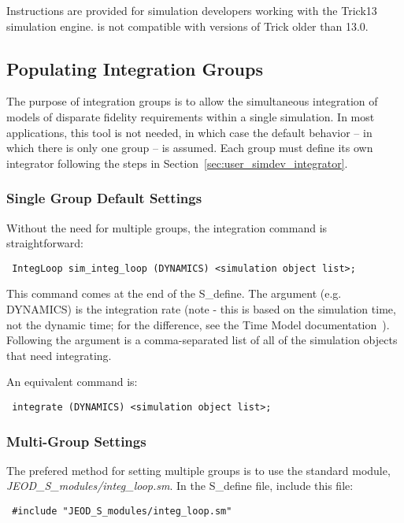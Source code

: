 Instructions are provided for simulation developers working with the Trick13 
simulation engine.  \JEODidx is not compatible with versions of Trick older than 13.0.

\subsection{Populating Integration Groups}\label{sec:user_simdev_groups}
The purpose of integration groups is to 
allow the simultaneous integration of models of disparate fidelity 
requirements within a single simulation.  In most applications, this tool is 
not needed, in which case the default behavior  -- in which there is 
only one group -- is assumed.  Each group must define its own integrator 
following the steps in 
Section~\ref{sec:user_simdev_integrator}.

\subsubsection{Single Group Default Settings}
Without the need for multiple groups, the integration command is 
straightforward:

\begin{verbatim}
 IntegLoop sim_integ_loop (DYNAMICS) <simulation object list>;
\end{verbatim}

This command comes at the end of the S\_define.  The argument (e.g. DYNAMICS) 
is the integration rate (note - this is based on the simulation time, not the 
dynamic time; for the difference, see the Time Model 
documentation~\cite{dynenv:TIME}).  Following the argument is a 
comma-separated list of all of the simulation objects that need integrating.

An equivalent command is:
\begin{verbatim}
 integrate (DYNAMICS) <simulation object list>;
\end{verbatim}


\subsubsection{Multi-Group Settings}

The prefered method for setting multiple groups is to use the standard module, 
\textit{JEOD\_S\_modules/integ\_loop.sm}.  In the S\_define file, include this 
file:
\begin{verbatim}
 #include "JEOD_S_modules/integ_loop.sm"
\end{verbatim}

